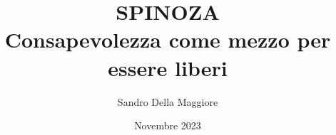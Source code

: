 \documentclass[a4paper,12pt,oneside,openany]{book}%
\begin{document}
	\author{Sandro Della Maggiore}
	\title{\Huge SPINOZA\\{\Large Consapevolezza come mezzo per essere liberi}}
	\date{Novembre 2023}
	\maketitle
		
	
		
	
	
	
	
	
	

	
\end{document}
